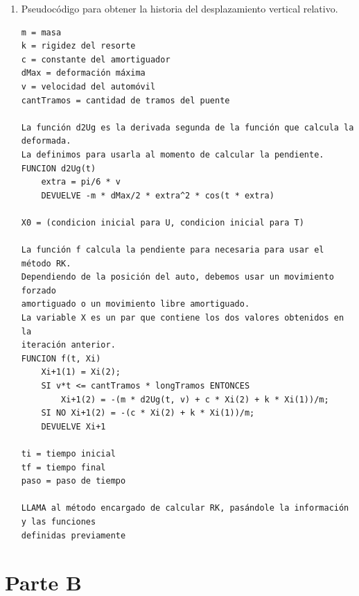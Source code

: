 \documentclass[10pt]{article}
\begin{document}
\begin{enumerate}
 \item Pseudocódigo para obtener la historia del desplazamiento vertical relativo.
 \begin{verbatim}
m = masa
k = rigidez del resorte
c = constante del amortiguador
dMax = deformación máxima
v = velocidad del automóvil
cantTramos = cantidad de tramos del puente
 
La función d2Ug es la derivada segunda de la función que calcula la deformada.
La definimos para usarla al momento de calcular la pendiente.
FUNCION d2Ug(t) 
    extra = pi/6 * v
    DEVUELVE -m * dMax/2 * extra^2 * cos(t * extra)

X0 = (condicion inicial para U, condicion inicial para T)

La función f calcula la pendiente para necesaria para usar el método RK.
Dependiendo de la posición del auto, debemos usar un movimiento forzado
amortiguado o un movimiento libre amortiguado.
La variable X es un par que contiene los dos valores obtenidos en la
iteración anterior.
FUNCION f(t, Xi)
    Xi+1(1) = Xi(2);
    SI v*t <= cantTramos * longTramos ENTONCES
        Xi+1(2) = -(m * d2Ug(t, v) + c * Xi(2) + k * Xi(1))/m;
    SI NO Xi+1(2) = -(c * Xi(2) + k * Xi(1))/m;
    DEVUELVE Xi+1

ti = tiempo inicial
tf = tiempo final
paso = paso de tiempo

LLAMA al método encargado de calcular RK, pasándole la información y las funciones
definidas previamente 
\end{verbatim}

\end{enumerate}


\section*{Parte B}
\end{document}
